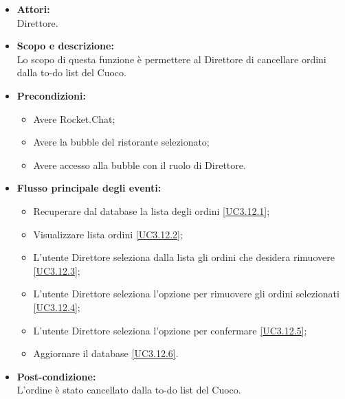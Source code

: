 \begin{itemize}
	\item \textbf{Attori:}
	\\Direttore.
	\item \textbf{Scopo e descrizione:} 
	\\Lo scopo di questa funzione è permettere al Direttore di cancellare ordini dalla to-do list del Cuoco.
	\item \textbf{Precondizioni:}
	\begin{itemize}
		\item Avere Rocket.Chat;
		\item Avere la bubble del ristorante selezionato;
		\item Avere accesso alla bubble con il ruolo di Direttore.
	\end{itemize}
	\item \textbf{Flusso principale degli eventi:}
	\begin{itemize}
		\item Recuperare dal database la lista degli ordini \ref{UC3.12.1};
		\item Visualizzare lista ordini \ref{UC3.12.2};
		\item L'utente Direttore seleziona dalla lista gli ordini che desidera rimuovere \ref{UC3.12.3};
		\item L'utente Direttore seleziona l'opzione per rimuovere gli ordini selezionati \ref{UC3.12.4};
		\item L'utente Direttore seleziona l'opzione per confermare \ref{UC3.12.5};
		\item Aggiornare il database \ref{UC3.12.6}.
	\end{itemize}
	\item \textbf{Post-condizione:}
	\\L'ordine è stato cancellato dalla to-do list del Cuoco.
\end{itemize}


